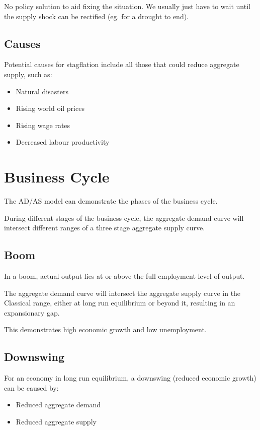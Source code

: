 \documentclass[a4paper,11pt]{article}
\begin{document}
No policy solution to aid fixing the situation. We usually just have to wait
until the supply shock can be rectified (eg. for a drought to end).


\subsection{Causes}

Potential causes for stagflation include all those that could reduce aggregate
supply, such as:

\begin{itemize}
\item Natural disasters
\item Rising world oil prices
\item Rising wage rates
\item Decreased labour productivity
\end{itemize}




\section{Business Cycle}

The AD/AS model can demonstrate the phases of the business cycle.

During different stages of the business cycle, the aggregate demand curve will
intersect different ranges of a three stage aggregate supply curve.


\subsection{Boom}

In a boom, actual output lies at or above the full employment level of output.

The aggregate demand curve will intersect the aggregate supply curve in the
Classical range, either at long run equilibrium or beyond it, resulting in an
expansionary gap.

This demonstrates high economic growth and low unemployment.


\subsection{Downswing}

For an economy in long run equilibrium, a downswing (reduced economic growth)
can be caused by:

\begin{itemize}
\item Reduced aggregate demand
\item Reduced aggregate supply
\end{itemize}
\end{document}
